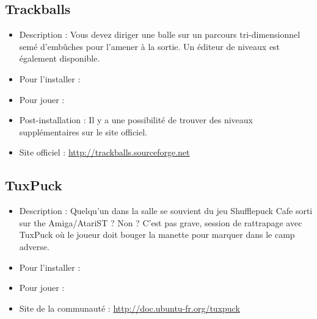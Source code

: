 \subsection{Trackballs}
\begin{itemize}
\begingroup
{}
\item Description : Vous devez diriger une balle sur un parcours tri-dimensionnel semé d'embûches pour l'amener à la sortie. Un éditeur de niveaux est également disponible.{\par}
\item Pour l'installer : 
\endgroup
\item Pour jouer : 
\item Post-installation : Il y a une possibilité de trouver des niveaux supplémentaires sur le site officiel.{\par}
\item Site officiel : \url{http://trackballs.sourceforge.net}{\par}
\end{itemize}
\subsection{TuxPuck}
\begin{itemize}
\begingroup
{}
\item Description : Quelqu'un dans la salle se souvient du jeu Shufflepuck Cafe sorti sur the Amiga/AtariST ? Non ? C'est pas grave, session de rattrapage avec TuxPuck où le joueur doit bouger la manette pour marquer dans le camp adverse.{\par}
\item Pour l'installer : 
\item Pour jouer : 
\item Site de la communauté : \url{http://doc.ubuntu-fr.org/tuxpuck}{\par}
\endgroup
\end{itemize}
